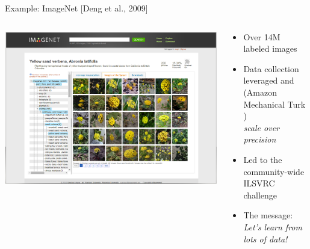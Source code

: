 \documentclass[usenames,dvipsnames,notes,11pt,aspectratio=169,hyperref={colorlinks=true, linkcolor=blue}]{beamer}
\begin{document}
\begin{frame}
    {Example: ImageNet [Deng et al., 2009]}
    \begin{columns}
        \begin{column}{0.5\textwidth}
            \includegraphics[width=\textwidth]{figures/imagenet}
        \end{column}
        \begin{column}{0.5\textwidth}
            \begin{itemize}
                \item Over 14M labeled images
                \item Data collection leveraged  and  (Amazon Mechanical Turk ) \\
                    {\it scale over precision}
                \item Led to the community-wide ILSVRC challenge
                \item The message:\\
                    \textit{Let's learn from lots of data!}
            \end{itemize}
        \end{column}
    \end{columns}
\end{frame}
\end{document}
